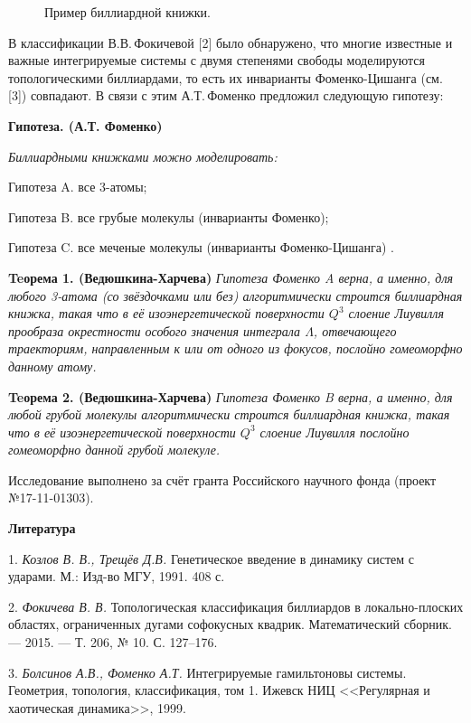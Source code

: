\begin{figure}[h!]
	\caption{Пример биллиардной книжки. \label{3obl}}
\end{figure}

В классификации В.В.\,Фокичевой [2]  было обнаружено, что многие известные и важные интегрируемые системы с двумя степенями свободы моделируются топологическими  биллиардами, то есть их инварианты Фоменко-Цишанга (см. [3]) совпадают. В связи с этим А.Т.\,Фоменко предложил следующую гипотезу:

\textbf{Гипотеза. (А.Т. Фоменко)}
{\it Биллиардными книжками можно моделировать:

	Гипотеза A. все 3-атомы;

	Гипотеза B. все грубые молекулы (инварианты Фоменко);

	Гипотеза C. все меченые молекулы (инварианты Фоменко-Цишанга) .
}

\textbf{Teорема 1. (Ведюшкина-Харчева)}  {\it Гипотеза Фоменко A верна, а именно, для любого 3-атома (со звёздочками или без) алгоритмически строится биллиардная книжка, такая что в её изоэнергетической поверхности $ Q^3 $ слоение Лиувилля прообраза окрестности особого значения интеграла $ \Lambda $, отвечающего траекториям, направленным к или от одного из фокусов, послойно гомеоморфно данному атому.}

\textbf{Teорема 2. (Ведюшкина-Харчева)}  {\it Гипотеза Фоменко B верна, а именно, для любой грубой молекулы алгоритмически строится биллиардная книжка, такая что в её изоэнергетической поверхности $ Q^3 $ слоение Лиувилля послойно гомеоморфно данной грубой молекуле.}

\vspace{\baselineskip}
Исследование выполнено за счёт гранта Российского научного фонда (проект №17-11-01303).

\smallskip \centerline{\bf Литература}\nopagebreak

1. {\it  Козлов В. В., Трещёв Д.В.} Генетическое введение в динамику систем с ударами. М.:  Изд-во МГУ, 1991. 408 с.

2. {\it Фокичева В. В.} Топологическая классификация биллиардов в локально-плоских областях, ограниченных дугами софокусных квадрик. Математический сборник. — 2015. — Т. 206, № 10. С. 127–176.

3. {\it Болсинов А.В., Фоменко А.Т.} Интегрируемые гамильтоновы системы. Геометрия, топология, классификация, том 1. Ижевск НИЦ <<Регулярная и хаотическая динамика>>, 1999.
